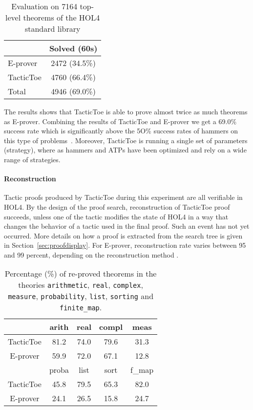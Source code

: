 \documentclass[runningheads,a4paper,draft]{svjour3}
\def\holfour{\textsf{HOL4}\xspace}
\def\eprover{\textsf{E-prover}\xspace}
\def\tactictoe{\textsf{TacticToe}\xspace}
\newcommand{\ra}[1]{\renewcommand{\arraystretch}{#1}}
\begin{document}
\begin{table}[h!]
\centering\ra{1.3}
\small
\begin{tabular}{lc}
\toprule
  & Solved (60s) \\
\midrule
   \eprover   & 2472 (34.5\%)\\
   \tactictoe & 4760 (66.4\%)\\
\midrule
   Total  & 4946 (69.0\%)\\
\bottomrule
\end{tabular}
\caption{Evaluation on 7164 top-level theorems of the \holfour standard library
\label{tab:_param}}
\end{table}

The results shows that \tactictoe is able to prove almost twice as much 
theorems as \eprover. Combining the results of \tactictoe and \eprover we get a 
69.0\% success rate which is significantly above the 5O\% success rates 
of hammers on this type of problems~\cite{tgck-cpp15}. Moreover, \tactictoe is 
running a single set of parameters (strategy), where as hammers and ATPs have 
been optimized and rely on a wide range of strategies. 


\paragraph{Reconstruction}
Tactic proofs produced by \tactictoe during this experiment are all verifiable 
in \holfour. By the design of the proof search, reconstruction of \tactictoe 
proof succeeds, unless one of the tactic modifies the state of \holfour in a 
way that changes the behavior of a tactic used in the final proof. Such an 
event has not yet occurred.
More details on how a proof is extracted from the search tree is given in 
Section~\ref{sec:proofdisplay}.
For \eprover, reconstruction rate varies between 95 and 99 percent, depending 
on the reconstruction method \cite{}.

\begin{table}[]
\centering
\setlength{\tabcolsep}{3mm}
\begin{tabular}{@{}ccccc@{}}
\toprule
\phantom{ab} & {arith} & {real} & {compl} & {meas} \\
\midrule
\tactictoe & 81.2 & 74.0 & 79.6 & 31.3\\
\eprover & 59.9 & 72.0 & 67.1 & 12.8\\
\midrule
\phantom{abc} & {proba} & {list} & {sort} & {f\_map} \\
\midrule
\tactictoe & 45.8 & 79.5 & 65.3 & 82.0 \\
\eprover & 24.1 & 26.5 & 15.8 & 24.7 \\
\bottomrule
\end{tabular}
\caption{\label{theories}Percentage (\%) of re-proved theorems in the theories
\texttt{arithmetic}, \texttt{real}, \texttt{complex}, \texttt{measure},
\texttt{probability}, \texttt{list}, \texttt{sorting} and \texttt{finite\_map}.
}
\end{table}
\end{document}
